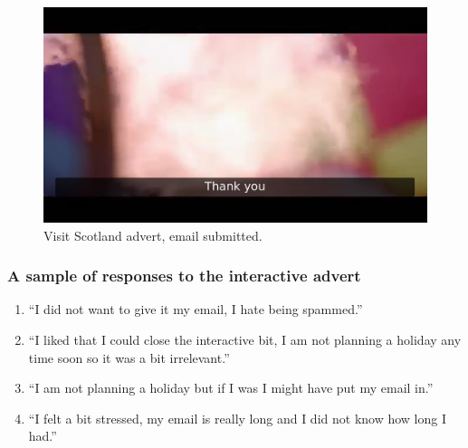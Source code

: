 	\begin{figure}[th]
		\centering
		\includegraphics[width=\textwidth,height=0.5\textheight,keepaspectratio]{images/adverts/visit_scotland-3.png}
		\caption{Visit Scotland advert, email submitted.}
		\label{fig:visit_scotland3}
	\end{figure}

\subsubsection*{A sample of responses to the interactive advert}
	\begin{enumerate}
		\item{``I did not want to give it my email, I hate being spammed.''}
		\item{``I liked that I could close the interactive bit, I am not planning a holiday any time soon so it was a bit irrelevant.''}
		\item{``I am not planning a holiday but if I was I might have put my email in.''}
		\item{``I felt a bit stressed, my email is really long and I did not know how long I had.''}
	\end{enumerate}